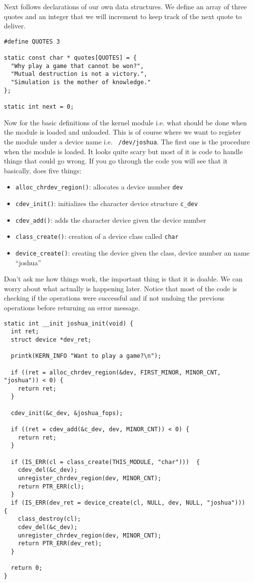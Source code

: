 \documentclass[a4paper,11pt]{article}
\begin{document}
Next follows declarations of our own data structures. We define an
array of three quotes and an integer that we will increment to keep
track of the next quote to deliver. 

\begin{lstlisting}
#define QUOTES 3

static const char * quotes[QUOTES] = {
  "Why play a game that cannot be won?",
  "Mutual destruction is not a victory.",
  "Simulation is the mother of knowledge."
};

static int next = 0;
\end{lstlisting}

Now for the basic definitions of the kernel module i.e. what should be
done when the module is loaded and unloaded. This is of course where
we want to register the module under a device name i.e. {\tt
  /dev/joshua}. The first one is the procedure when the module is
loaded. It looks quite scary but most of it is code to handle things
that could go wrong. If you go through the code you will see that it
basically, does five things:

\begin{itemize} 
\item {\tt alloc\_chrdev\_region()}: allocates a device number {\tt dev}
\item {\tt cdev\_init()}: initializes the character device structure {\tt c\_dev}
\item {\tt cdev\_add()}: adds the character device given the device number
\item {\tt class\_create()}: creation of a device class called {\tt char}
\item {\tt device\_create()}: creating the device given the class, device number an name ``joshua''
\end{itemize}

Don't ask me how things work, the important thing is that it is
doable. We can worry about what actually is happening later. Notice
that most of the code is checking if the operations were successful and
if not undoing the previous operations before returning an error message. 

\begin{lstlisting}
static int __init joshua_init(void) {
  int ret;
  struct device *dev_ret;
 
  printk(KERN_INFO "Want to play a game?\n");

  if ((ret = alloc_chrdev_region(&dev, FIRST_MINOR, MINOR_CNT, "joshua")) < 0) {
    return ret;
  }
 
  cdev_init(&c_dev, &joshua_fops);
 
  if ((ret = cdev_add(&c_dev, dev, MINOR_CNT)) < 0) {
    return ret;
  }
     
  if (IS_ERR(cl = class_create(THIS_MODULE, "char")))  {
    cdev_del(&c_dev);
    unregister_chrdev_region(dev, MINOR_CNT);
    return PTR_ERR(cl);
  }
  if (IS_ERR(dev_ret = device_create(cl, NULL, dev, NULL, "joshua"))) {
    class_destroy(cl);
    cdev_del(&c_dev);
    unregister_chrdev_region(dev, MINOR_CNT);
    return PTR_ERR(dev_ret);
  }
 
  return 0;
}
\end{lstlisting}
\end{document}
